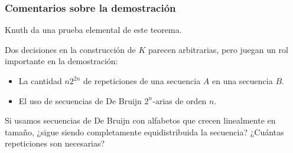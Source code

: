 \documentclass[t, 10pt, mathserif]{beamer}
\begin{document}
\begin{frame}
  \frametitle{Comentarios sobre la demostración}

  Knuth da una prueba elemental de este teorema.
  \pause
  
  Dos decisiones en la construcción de $K$ parecen arbitrarias, pero juegan un rol importante en la demostración:
  \pause

  \begin{itemize}
    \item La cantidad $n 2^{2n}$ de repeticiones de una secuencia $A$ en una secuencia $B$. \pause
  
    \item El uso de secuencias de De Bruijn $2^n$-arias de orden $n$.

  \end{itemize}
  \pause

  Si usamos secuencias de De Bruijn con alfabetos que crecen linealmente en tamaño, {\color{cyan}¿sigue siendo completamente equidistribuida la secuencia? ¿Cuántas repeticiones son necesarias?}
\end{frame}

\end{document}
